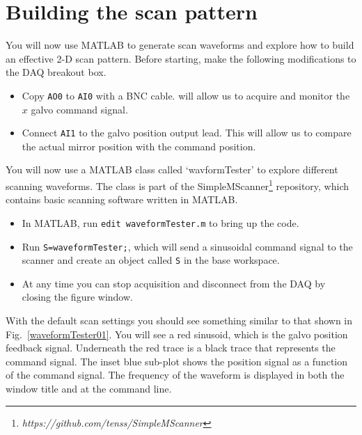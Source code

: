 \documentclass[a4paper]{report}
\begin{document}
\section{Building the scan pattern}

You will now use MATLAB to generate scan waveforms and explore how to build an effective 2-D scan pattern. 
Before starting, make the following modifications to the DAQ breakout box. 

\begin{itemize}
    \setlength\itemsep{0.15em}
    \item Copy \texttt{AO0} to \texttt{AI0} with a BNC cable. will allow us to acquire and monitor the $x$ galvo command signal.
    \item Connect \texttt{AI1} to the galvo position output lead. This will allow us to compare the actual mirror position with the command position.
\end{itemize}

\noindent
You will now use a MATLAB class called `wavformTester' to explore different scanning waveforms.
The class is part of the SimpleMScanner\footnote{\textit{https://github.com/tenss/SimpleMScanner}} repository, which contains basic scanning software written in MATLAB.


\begin{itemize}
\setlength\itemsep{0.15em}
\item In MATLAB, run \texttt{edit waveformTester.m} to bring up the code. 
\item Run \texttt{S=waveformTester;}, which will send a sinusoidal command signal to the scanner and create an object called \texttt{S} in the base workspace.
\item At any time you can stop acquisition and disconnect from the DAQ by closing the figure window.
\end{itemize}

\noindent
With the default scan settings you should see something similar to that shown in Fig.~\ref{waveformTester01}.
You will see a red sinusoid, which is the galvo position feedback signal. 
Underneath the red trace is a black trace that represents the command signal. 
The inset blue sub-plot shows the position signal as a function of the command signal. 
The frequency of the waveform is displayed in both the window title and at the command line. 
\end{document}
